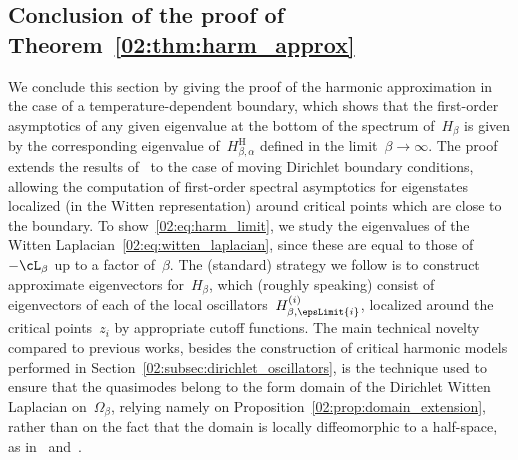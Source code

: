     \subsection{Conclusion of the proof of Theorem~\ref{02:thm:harm_approx}}
    \label{02:subsubsec:harm_approx_final_proof}
    We conclude this section by giving the proof of the harmonic approximation in the case of a temperature-dependent boundary, which shows that the first-order asymptotics of any given eigenvalue at the bottom of the spectrum of~$H_{\beta}$ is given by the corresponding eigenvalue of~$H_{\beta,\alpha}^{\mathrm H}$ defined in the limit~$\beta\to\infty$.
    The proof extends the results of~\cite{CFKS87,S83} to the case of moving Dirichlet boundary conditions, allowing the computation of first-order spectral asymptotics for eigenstates localized (in the Witten representation) around critical points which are close to the boundary.
    To show~\eqref{02:eq:harm_limit}, we study the eigenvalues of the Witten Laplacian~\eqref{02:eq:witten_laplacian}, since these are equal to those of~$-\cL_\beta$ up to a factor of~$\beta$.
    The (standard) strategy we follow is to construct approximate eigenvectors for~$H_\beta$, which (roughly speaking) consist of eigenvectors of each of the local oscillators~$H_{\beta,\epsLimit{i}}^{(i)}$, localized around the critical points~$z_i$ by appropriate cutoff functions.
    The main technical novelty compared to previous works, besides the construction of critical harmonic models performed in Section~\ref{02:subsec:dirichlet_oscillators}, is the technique used to ensure that the quasimodes belong to the form domain of the Dirichlet Witten Laplacian on~$\Omega_\beta$, relying namely on Proposition~\ref{02:prop:domain_extension}, rather than on the fact that the domain is locally diffeomorphic to a half-space, as in~\cite{HN06} and~\cite{LLPN22}.


